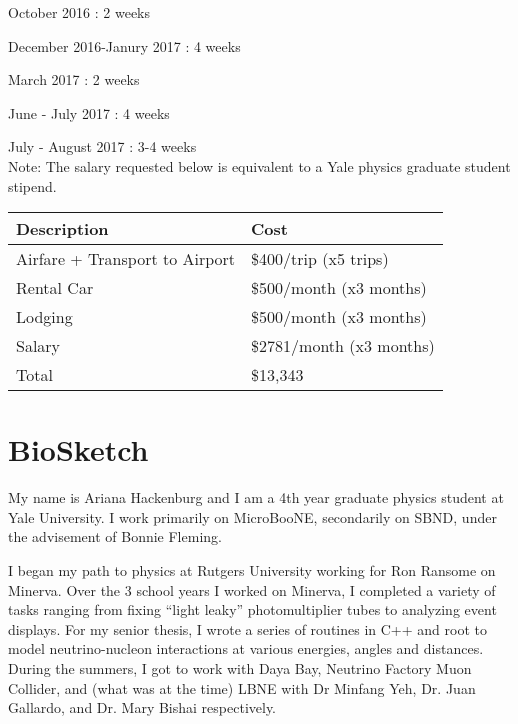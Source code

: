 \documentclass[12pt]{article}
\begin{document}
\par October 2016              : 2 weeks
\par December 2016-Janury 2017 : 4 weeks
\par March 2017                : 2 weeks
\par June - July 2017          : 4 weeks
\par July - August 2017        : 3-4 weeks \\

\noindent Note: The salary requested below is equivalent to a Yale physics graduate student stipend. 
\begin{table}[h!]
 \begin{tabular}{| l | l |} 
 \hline
 Description & Cost \\ [0.5ex] 
 \hline\hline
  Airfare + Transport to Airport & \$400/trip (x5 trips) \\ \hline
  Rental Car & \$500/month  (x3 months) \\ \hline
  Lodging   & \$500/month     (x3 months) \\ \hline
  Salary    & \$2781/month (x3 months) \\ \hline
  Total  & \$13,343 \\ \hline
 \end{tabular}
\end{table}

\newpage
\section{BioSketch}
My name is Ariana Hackenburg and I am a 4th year graduate physics student at Yale University. I work primarily on MicroBooNE, secondarily on SBND, under the advisement of Bonnie Fleming. \\ 

\par I began my path to physics at Rutgers University working for Ron Ransome on Minerva. Over the 3 school years I worked on Minerva, I completed a variety of tasks ranging from fixing “light leaky” photomultiplier tubes to analyzing event displays. For my senior thesis, I wrote a series of routines in C++ and root to model neutrino-nucleon interactions at various energies, angles and distances. During the summers, I got to work with Daya Bay, Neutrino Factory Muon Collider, and (what was at the time) LBNE with Dr Minfang Yeh, Dr. Juan Gallardo, and Dr. Mary Bishai respectively. \\
\end{document}
